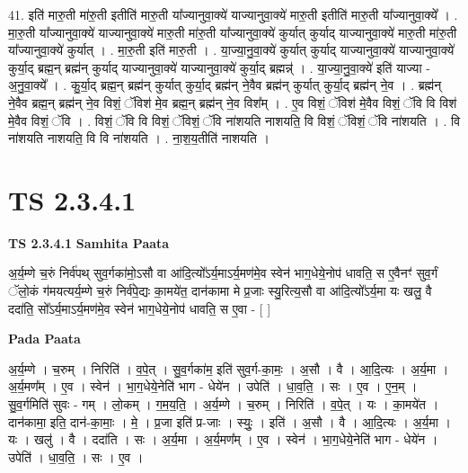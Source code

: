 \documentclass[17pt]{extarticle}
\begin{document}
41. इति॑ मारु॒ती मा॑रु॒ती इतीति॑ मारु॒ती या᳚ज्यानुवा॒क्ये॑ याज्यानुवा॒क्ये॑ मारु॒ती इतीति॑ मारु॒ती या᳚ज्यानुवा॒क्ये᳚ । . मा॒रु॒ती या᳚ज्यानुवा॒क्ये॑ याज्यानुवा॒क्ये॑ मारु॒ती मा॑रु॒ती या᳚ज्यानुवा॒क्ये॑ कुर्यात् कुर्याद् याज्यानुवा॒क्ये॑ मारु॒ती मा॑रु॒ती या᳚ज्यानुवा॒क्ये॑ कुर्यात् । . मा॒रु॒ती इति॑ मारु॒ती । . या॒ज्या॒नु॒वा॒क्ये॑ कुर्यात् कुर्याद् याज्यानुवा॒क्ये॑ याज्यानुवा॒क्ये॑ कुर्या॒द् ब्रह्म॒न् ब्रह्म॑न् कुर्याद् याज्यानुवा॒क्ये॑ याज्यानुवा॒क्ये॑ कुर्या॒द् ब्रह्मन्न्॑ । . या॒ज्या॒नु॒वा॒क्ये॑ इति॑ याज्या - अ॒नु॒वा॒क्ये᳚ । . कु॒र्या॒द् ब्रह्म॒न् ब्रह्म॑न् कुर्यात् कुर्या॒द् ब्रह्म॑न् ने॒वैव ब्रह्म॑न् कुर्यात् कुर्या॒द् ब्रह्म॑न् ने॒व । . ब्रह्म॑न् ने॒वैव ब्रह्म॒न् ब्रह्म॑न् ने॒व विशं॒ ॅविश॑ मे॒व ब्रह्म॒न् ब्रह्म॑न् ने॒व विश᳚म् । . ए॒व विशं॒ ॅविश॑ मे॒वैव विशं॒ ॅवि वि विश॑ मे॒वैव विशं॒ ॅवि । . विशं॒ ॅवि वि विशं॒ ॅविशं॒ ॅवि ना॑शयति नाशयति॒ वि विशं॒ ॅविशं॒ ॅवि ना॑शयति । . वि ना॑शयति नाशयति॒ वि वि ना॑शयति । . ना॒श॒य॒तीति॑ नाशयति । \newline
\pagebreak
{}

\section{ TS 2.3.4.1 }

\textbf{TS 2.3.4.1 } \newline
\textbf{Samhita Paata} \newline

अ॒र्य॒म्णे च॒रुं निर्व॑पथ् सुव॒र्गका॑मो॒ऽसौ वा आ॑दि॒त्यो᳚ऽर्य॒माऽर्य॒मण॑मे॒व स्वेन॑ भाग॒धेये॒नोप॑ धावति॒ स ए॒वैनꣳ॑ सुव॒र्गं ॅलो॒कं ग॑मयत्यर्य॒म्णे च॒रुं निर्व॑पे॒द्यः का॒मये॑त॒ दान॑कामा मे प्र॒जाः स्यु॒रित्य॒सौ वा आ॑दि॒त्यो᳚ऽर्य॒मा यः खलु॒ वै ददा॑ति॒ सो᳚ऽर्य॒माऽर्य॒मण॑मे॒व स्वेन॑ भाग॒धेये॒नोप॑ धावति॒ स ए॒वा - [  ] \newline

\textbf{Pada Paata} \newline

अ॒र्य॒म्णे । च॒रुम् । निरिति॑ । व॒पे॒त् । सु॒व॒र्गका॑म॒ इति॑ सुव॒र्ग-का॒मः॒ । अ॒सौ । वै । आ॒दि॒त्यः । अ॒र्य॒मा । अ॒र्य॒मण᳚म् । ए॒व । स्वेन॑ । भा॒ग॒धेये॒नेति॑ भाग - धेये॑न । उपेति॑ । धा॒व॒ति॒ । सः । ए॒व । ए॒न॒म् । सु॒व॒र्गमिति॑ सुवः - गम् । लो॒कम् । ग॒म॒य॒ति॒ । अ॒र्य॒म्णे । च॒रुम् । निरिति॑ । व॒पे॒त् । यः । का॒मये॑त । दान॑कामा॒ इति॒ दान॑-का॒माः॒ । मे॒ । प्र॒जा इति॑ प्र-जाः । स्युः॒ । इति॑ । अ॒सौ । वै । आ॒दि॒त्यः । अ॒र्य॒मा । यः । खलु॑ । वै । ददा॑ति । सः । अ॒र्य॒मा । अ॒र्य॒मण᳚म् । ए॒व । स्वेन॑ । भा॒ग॒धेये॒नेति॑ भाग - धेये॑न । उपेति॑ । धा॒व॒ति॒ । सः । ए॒व ।  \newline
\end{document}

